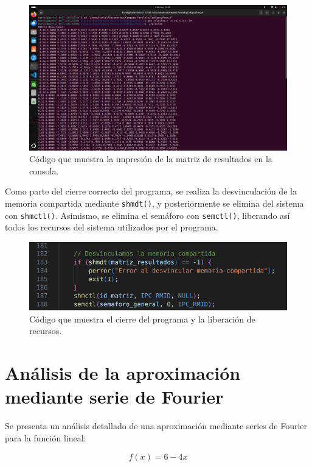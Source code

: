 {\begin{figure}[H]
    \centering
    \includegraphics[width=0.9\linewidth]{Figures/codigo/impresion_matriz.png}
    \caption[Impresión de la matriz de resultados]{Código que muestra la impresión de la matriz de resultados en la consola.}
    \label{fig:impresion-matriz}
\end{figure}

Como parte del cierre correcto del programa, se realiza la desvinculación de la memoria compartida mediante \texttt{shmdt()}, y posteriormente se elimina del sistema con \texttt{shmctl()}. Asimismo, se elimina el semáforo con \texttt{semctl()}, liberando así todos los recursos del sistema utilizados por el programa.

\begin{figure}[H]
    \centering
    \includegraphics[width=0.9\linewidth]{Figures/codigo/cierre.png}
    \caption[Cierre del programa y liberación de recursos]{Código que muestra el cierre del programa y la liberación de recursos.}
    \label{fig:cierre-programa}
\end{figure}


\section{Análisis de la aproximación mediante serie de Fourier}

Se presenta un análisis detallado de una aproximación mediante series de Fourier para la función lineal:

\[
f(x) = 6 - 4x
\]

}
